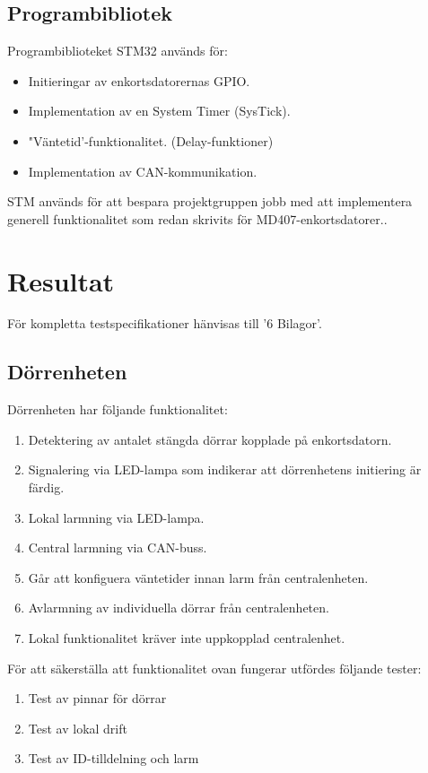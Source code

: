 \documentclass{article}
\begin{document}
\subsection{Programbibliotek}
\label{stm}
Programbiblioteket STM32\cite{stm} används för:
\begin{itemize}
    \item Initieringar av enkortsdatorernas GPIO.
    \item Implementation av en System Timer (SysTick).
    \item "Väntetid'-funktionalitet. (Delay-funktioner)
    \item Implementation av CAN-kommunikation.
\end{itemize}

STM används för att bespara projektgruppen jobb med att implementera \\ generell funktionalitet
 som redan skrivits för MD407-enkortsdatorer.. 

 \section{Resultat}
 För kompletta testspecifikationer hänvisas till '6 Bilagor'.
 
 
 \subsection{Dörrenheten}
 Dörrenheten har följande funktionalitet:
 \begin{enumerate}
     \item Detektering av antalet stängda dörrar kopplade på enkortsdatorn.
     \item Signalering via LED-lampa som indikerar att dörrenhetens initiering är färdig.
     \item Lokal larmning via LED-lampa.
     \item Central larmning via CAN-buss.
     \item Går att konfiguera väntetider innan larm från centralenheten.
     \item Avlarmning av individuella dörrar från centralenheten.
     \item Lokal funktionalitet kräver inte uppkopplad centralenhet.
     
 \end{enumerate}
 För att säkerställa att funktionalitet ovan fungerar utfördes följande tester:
 \begin{enumerate}
     \item Test av pinnar för dörrar
     \item Test av lokal drift
     \item Test av ID-tilldelning och larm
 \end{enumerate}
 
\end{document}
